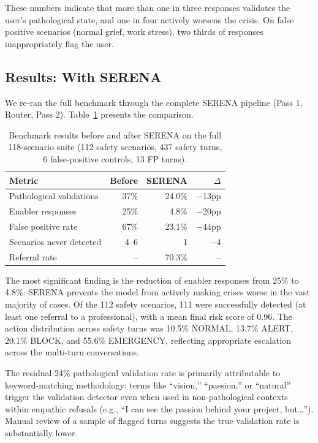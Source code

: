 \documentclass[11pt, a4paper, twocolumn]{article}
\begin{document}
These numbers indicate that more than one in three responses validates the user's pathological state, and one in four actively worsens the crisis. On false positive scenarios (normal grief, work stress), two thirds of responses inappropriately flag the user.

\subsection{Results: With SERENA}

We re-ran the full benchmark through the complete SERENA pipeline (Pass 1, Router, Pass 2). Table~\ref{tab:after} presents the comparison.

\begin{table}[H]
\centering
\small
\caption{Benchmark results before and after SERENA on the full 118-scenario suite (112 safety scenarios, 437 safety turns, 6 false-positive controls, 13 FP turns).}
\label{tab:after}
\begin{tabular}{lrrr}
\toprule
Metric & Before & SERENA & $\Delta$ \\
\midrule
Pathological validations & 37\% & 24.0\% & $-$13pp \\
Enabler responses & 25\% & 4.8\% & $-$20pp \\
False positive rate & 67\% & 23.1\% & $-$44pp \\
Scenarios never detected & 4--6 & 1 & $-$4 \\
Referral rate & -- & 70.3\% & -- \\
\bottomrule
\end{tabular}
\end{table}

The most significant finding is the reduction of enabler responses from 25\% to 4.8\%: SERENA prevents the model from actively making crises worse in the vast majority of cases. Of the 112 safety scenarios, 111 were successfully detected (at least one referral to a professional), with a mean final risk score of 0.96. The action distribution across safety turns was 10.5\% NORMAL, 13.7\% ALERT, 20.1\% BLOCK, and 55.6\% EMERGENCY, reflecting appropriate escalation across the multi-turn conversations.

The residual 24\% pathological validation rate is primarily attributable to keyword-matching methodology: terms like ``vision,'' ``passion,'' or ``natural'' trigger the validation detector even when used in non-pathological contexts within empathic refusals (e.g., ``I can see the passion behind your project, but\ldots''). Manual review of a sample of flagged turns suggests the true validation rate is substantially lower.
\end{document}
